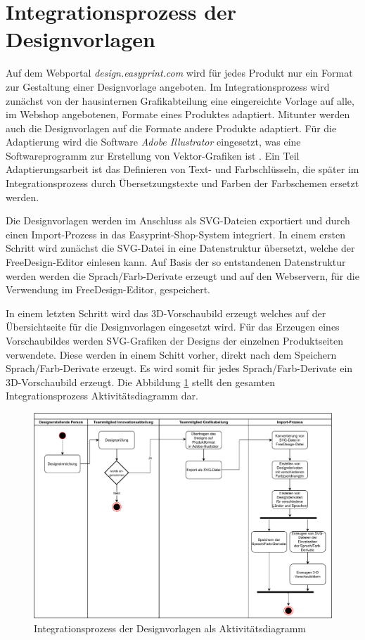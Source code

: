 \section{Integrationsprozess der Designvorlagen}
Auf dem Webportal \emph{design.easyprint.com} wird für jedes Produkt nur ein Format zur Gestaltung einer Designvorlage angeboten. Im Integrationsprozess wird zunächst von der hausinternen Grafikabteilung eine eingereichte Vorlage auf alle, im Webshop angebotenen, Formate eines Produktes adaptiert. Mitunter werden auch die Designvorlagen auf die Formate andere Produkte adaptiert. Für die Adaptierung wird die Software \emph{Adobe Illustrator} eingesetzt, was eine Softwareprogramm zur Erstellung von Vektor-Grafiken ist \autocite[vgl.][]{Adobe:Illustrator}. 
Ein Teil Adaptierungsarbeit ist das Definieren von Text- und Farbschlüsseln, die später im Integrationsprozess durch Übersetzungstexte und Farben der Farbschemen ersetzt werden. 

Die Designvorlagen werden im Anschluss als SVG-Dateien exportiert und durch einen Import-Prozess in das Easyprint-Shop-System integriert. 
In einem ersten Schritt wird zunächst die SVG-Datei in eine Datenstruktur übersetzt, welche der FreeDesign-Editor einlesen kann. Auf Basis der so entstandenen  
Datenstruktur werden werden die Sprach/Farb-Derivate erzeugt und auf den Webservern, für die Verwendung im FreeDesign-Editor, gespeichert.  

In einem letzten Schritt wird das 3D-Vorschaubild erzeugt welches auf der Übersichtseite für die Designvorlagen eingesetzt wird. Für das Erzeugen eines Vorschaubildes werden SVG-Grafiken der Designs der einzelnen Produktseiten verwendete. 
Diese werden in einem Schitt vorher, direkt nach dem Speichern Sprach/Farb-Derivate erzeugt. Es wird somit für jedes Sprach/Farb-Derivate ein 3D-Vorschaubild erzeugt.
Die Abbildung \ref{fig:Vorlagenimport} stellt den gesamten Integrationsprozess Aktivitätsdiagramm dar.

\begin{figure}[H]
    \centering
    \includegraphics[width=.98\textwidth]{diagrams/FreeDesign-Vorlagenerstellung.pdf}
\caption{Integrationsprozess der Designvorlagen als Aktivitätsdiagramm}
\label{fig:Vorlagenimport}
\end{figure}


